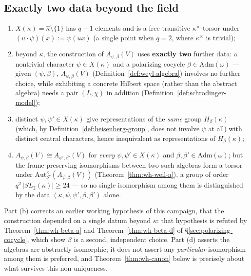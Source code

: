 
\subsection{Exactly two data beyond the field}

\statusProved
\begin{theorem}
\label{thm:wh-choice}
\begin{enumerate}[label=(\alph*)]
\item $X(\kappa) = \hat\kappa\setminus\{1\}$ has $q-1$ elements and is a
free transitive $\kappa^\times$-torsor under $(u\cdot\psi)(x):=\psi(ux)$
(a single point when $q=2$, where $\kappa^\times$ is trivial);
\item beyond $\kappa$, the construction of $A_{\psi,\beta}(V)$ uses
\textbf{exactly two} further data: a nontrivial character
$\psi\in X(\kappa)$ and a polarizing cocycle $\beta\in\mathrm{Adm}(\omega)$
— given $(\psi,\beta)$, $A_{\psi,\beta}(V)$ (Definition~\ref{def:weyl-algebra})
involves no further choice, while exhibiting a concrete Hilbert space
(rather than the abstract algebra) needs a pair $(L,\chi)$ in addition
(Definition~\ref{def:schrodinger-model});
\item distinct $\psi,\psi'\in X(\kappa)$ give representations of the
\emph{same} group $H_\beta(\kappa)$ (which, by Definition~\ref{def:heisenberg-group},
does not involve $\psi$ at all) with distinct central characters, hence
inequivalent as representations of $H_\beta(\kappa)$;
\item $A_{\psi,\beta}(V) \cong A_{\psi',\beta'}(V)$ for \emph{every}
$\psi,\psi'\in X(\kappa)$ and $\beta,\beta'\in\mathrm{Adm}(\omega)$; but the
frame-preserving isomorphisms between two such algebras form a torsor under
$\mathrm{Aut}_{\mathcal{F}}^\kappa(A_{\psi,\beta}(V))$
(Theorem~\ref{thm:wh-weil-a}), a group of order $q^2\,|SL_2(\kappa)| \geq 24$
— so no single isomorphism among them is distinguished by the data
$(\kappa,\psi,\psi',\beta,\beta')$ alone.
\end{enumerate}
\end{theorem}

\begin{scope}
Part (b) corrects an earlier working hypothesis of this campaign, that the
construction depended on a single datum beyond $\kappa$: that hypothesis is
refuted by Theorem~\ref{thm:wh-beta-a} and Theorem~\ref{thm:wh-beta-d} of
\S\ref{sec:polarizing-cocycle}, which show $\beta$ is a second, independent
choice. Part (d) asserts the algebras are abstractly isomorphic; it does not
assert any \emph{particular} isomorphism among them is preferred, and
Theorem~\ref{thm:wh-canon} below is precisely about what survives this
non-uniqueness.
\end{scope}

